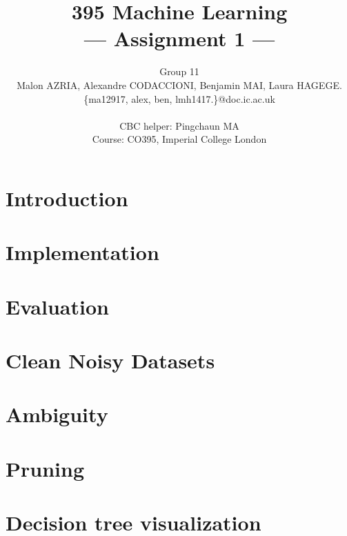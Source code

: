 \documentclass[a4paper,11pt]{article}
\title{395 Machine Learning\\\Large{--- Assignment 1 ---}}
\author{Group 11\\Malon AZRIA, Alexandre CODACCIONI, Benjamin MAI, Laura HAGEGE.\\
       \{ma12917, alex, ben, lmh1417.\}@doc.ic.ac.uk\\ \\
       \small{CBC helper: Pingchaun MA}\\
       \small{Course: CO395, Imperial College London}
}
\begin{document}
\maketitle

\section{Introduction}
    


\section{Implementation}
    
 
    
\section{Evaluation}
    
	
\section{Clean Noisy Datasets}
     


\section{Ambiguity}
	

\newpage 
\section{Pruning}
    

\newpage
\section{Decision tree visualization}
    
\end{document}
